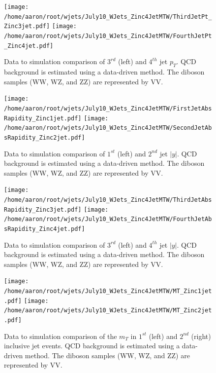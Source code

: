 \documentclass[oneside, letterpaper, oldfontcommands]{memoir}
\begin{document}
\begin{figure}[!Hhtbp]
\begin{center}
\texttt{[image: /home/aaron/root/wjets/July10\_WJets\_Zinc4JetMTW/ThirdJetPt\_Zinc3jet.pdf]}
\texttt{[image: /home/aaron/root/wjets/July10\_WJets\_Zinc4JetMTW/FourthJetPt\_Zinc4jet.pdf]}
\end{center}
\caption{Data to simulation comparison of $3^{rd}$ (left) and $4^{th}$ jet $p_{T}$. QCD background is estimated using a data-driven method. The diboson samples (WW, WZ, and ZZ) are represented by VV.}
\label{pt34}
\end{figure}

\begin{figure}[!Hhtbp]
\begin{center}
\texttt{[image: /home/aaron/root/wjets/July10\_WJets\_Zinc4JetMTW/FirstJetAbsRapidity\_Zinc1jet.pdf]}
\texttt{[image: /home/aaron/root/wjets/July10\_WJets\_Zinc4JetMTW/SecondJetAbsRapidity\_Zinc2jet.pdf]}
\end{center}
\caption{Data to simulation comparison of $1^{st}$ (left) and $2^{nd}$ jet $|y|$. QCD background is estimated using a data-driven method. The diboson samples (WW, WZ, and ZZ) are represented by VV.}
\label{eta12}
\end{figure}

\begin{figure}[!Hhtbp]
\begin{center}
\texttt{[image: /home/aaron/root/wjets/July10\_WJets\_Zinc4JetMTW/ThirdJetAbsRapidity\_Zinc3jet.pdf]}
\texttt{[image: /home/aaron/root/wjets/July10\_WJets\_Zinc4JetMTW/FourthJetAbsRapidity\_Zinc4jet.pdf]}
\end{center}
\caption{Data to simulation comparison of $3^{rd}$ (left) and $4^{th}$ jet $|y|$. QCD background is estimated using a data-driven method. The diboson samples (WW, WZ, and ZZ) are represented by VV.}
\label{eta34}
\end{figure}

\begin{figure}[!Hhtbp]
\begin{center}
\texttt{[image: /home/aaron/root/wjets/July10\_WJets\_Zinc4JetMTW/MT\_Zinc1jet.pdf]}
\texttt{[image: /home/aaron/root/wjets/July10\_WJets\_Zinc4JetMTW/MT\_Zinc2jet.pdf]}
\end{center}
\caption{Data to simulation comparison of the $m_{T}$ in $1^{st}$ (left) and $2^{nd}$ (right) inclusive jet events. QCD background is estimated using a data-driven method. The diboson samples (WW, WZ, and ZZ) are represented by VV.}
\label{eta12}
\end{figure}
\end{document}
